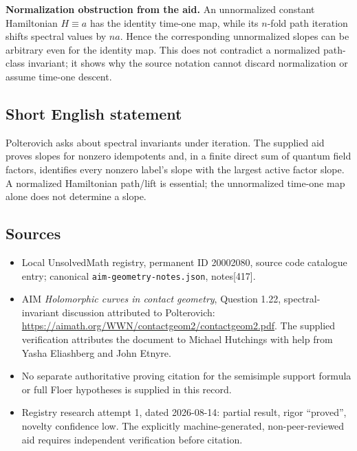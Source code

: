 \documentclass[11pt]{article}
\begin{document}
\textbf{Normalization obstruction from the aid.} An unnormalized constant Hamiltonian $H\equiv a$ has the identity time-one map, while its $n$-fold path iteration shifts spectral values by $na$. Hence the corresponding unnormalized slopes can be arbitrary even for the identity map. This does not contradict a normalized path-class invariant; it shows why the source notation cannot discard normalization or assume time-one descent.
\subsection{Short English statement}
Polterovich asks about spectral invariants under iteration. The supplied aid proves slopes for nonzero idempotents and, in a finite direct sum of quantum field factors, identifies every nonzero label's slope with the largest active factor slope. A normalized Hamiltonian path/lift is essential; the unnormalized time-one map alone does not determine a slope.
\subsection{Sources}
\begin{itemize}
\item Local UnsolvedMath registry, permanent ID 20002080, source code catalogue entry; canonical \texttt{aim-geometry-notes.json}, notes[417].
\item AIM \emph{Holomorphic curves in contact geometry}, Question 1.22, spectral-invariant discussion attributed to Polterovich: \url{https://aimath.org/WWN/contactgeom2/contactgeom2.pdf}. The supplied verification attributes the document to Michael Hutchings with help from Yasha Eliashberg and John Etnyre.
\item No separate authoritative proving citation for the semisimple support formula or full Floer hypotheses is supplied in this record.
\item Registry research attempt 1, dated 2026-08-14: partial result, rigor ``proved'', novelty confidence low. The explicitly machine-generated, non-peer-reviewed aid requires independent verification before citation.
\end{itemize}
\end{document}
